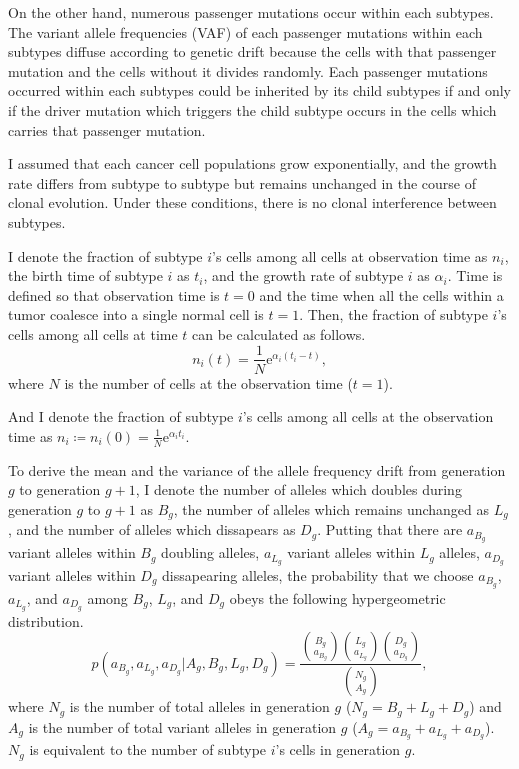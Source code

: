 \documentclass[12pt]{article}
\newcommand{\napier}{\mathrm{e}}
\begin{document}
On the other hand, numerous passenger mutations occur within each subtypes. The variant allele frequencies (VAF) of each passenger mutations within each subtypes diffuse according to genetic drift because the cells with that passenger mutation and the cells without it divides randomly. Each passenger mutations occurred within each subtypes could be inherited by its child subtypes if and only if the driver mutation which triggers the child subtype occurs in the cells which carries that passenger mutation.

I assumed that each cancer cell populations grow exponentially, and the growth rate differs from subtype to subtype but remains unchanged in the course of clonal evolution. Under these conditions, there is no clonal interference between subtypes.

I denote the fraction of subtype $i$'s cells among all cells at observation time as $n_i$, the birth time of subtype $i$ as $t_i$, and the growth rate of subtype $i$ as $\alpha_i$.
Time is defined so that observation time is $t=0$ and the time when all the cells within a tumor coalesce into a single normal cell is $t=1$.
Then, the fraction of subtype $i$'s cells among all cells at time $t$ can be calculated as follows.
\begin{equation}
 n_i(t) = \frac{1}{N}\napier^{\alpha_i (t_i - t)},
\end{equation}
where $N$ is the number of cells at the observation time ($t=1$).

And I denote the fraction of subtype $i$'s cells among all cells at the observation time as $n_i \coloneqq n_i(0) = \frac{1}{N}\napier^{\alpha_i t_i}$.

To derive the mean and the variance of the allele frequency drift from generation $g$ to generation $g+1$, I denote the number of alleles which doubles during generation $g$ to $g+1$ as $B_g$, the number of alleles which remains unchanged as $L_g$, and the number of alleles which dissapears as $D_g$. Putting that there are $a_{B_g}$ variant alleles within $B_g$ doubling alleles, $a_{L_g}$ variant alleles within $L_g$ alleles, $a_{D_g}$ variant alleles within $D_g$ dissapearing alleles, the probability that we choose $a_{B_g}$, $a_{L_g}$, and $a_{D_g}$ among $B_g$, $L_g$, and $D_g$ obeys the following hypergeometric distribution.
\begin{equation}
 p(a_{B_g}, a_{L_g}, a_{D_g} | A_g, B_g, L_g, D_g) = \frac{{B_g \choose a_{B_g}}{L_g \choose a_{L_g}}{D_g \choose a_{D_g}}}{{N_g \choose A_g}},
\end{equation}
where $N_g$ is the number of total alleles in generation $g$ ($N_g = B_g + L_g + D_g$) and $A_g$ is the number of total variant alleles in generation $g$ ($A_g = a_{B_g} + a_{L_g} + a_{D_g}$).
$N_g$ is equivalent to the number of subtype $i$'s cells in generation $g$.
\end{document}

